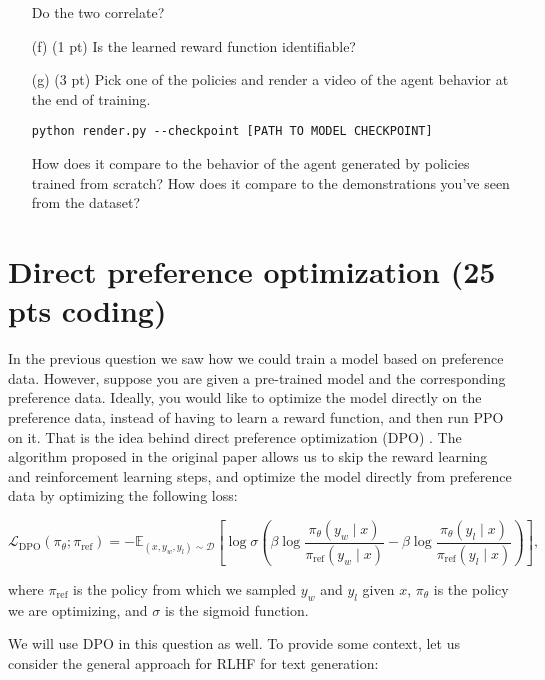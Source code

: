 \documentclass{article}
\begin{document}
\begin{enumerate}
Do the two correlate?

\item[(f) (1 pt)] Is the learned reward function identifiable?

\item[(g) (3 pt)] Pick one of the policies and render a video of the agent behavior at the end of training.

\begin{tcolorbox}
\begin{verbatim}
python render.py --checkpoint [PATH TO MODEL CHECKPOINT]
\end{verbatim}
\end{tcolorbox}

How does it compare to the behavior of the agent generated by policies trained from scratch? How does it compare to the demonstrations you've seen from the dataset?
\end{enumerate}

\section{Direct preference optimization (25 pts coding)}

In the previous question we saw how we could train a model based on preference data. However, suppose you are given a pre-trained model and the corresponding preference data. Ideally, you would like to optimize the model directly on the preference data, instead of having to learn a reward function, and then run PPO on it. That is the idea behind direct preference optimization (DPO) \cite{NEURIPS2023_a85b405e}. The algorithm proposed in the original paper allows us to skip the reward learning and reinforcement learning steps, and optimize the model directly from preference data by optimizing the following loss:

$$\mathcal{L}_{\mathrm{DPO}}\left(\pi_\theta ; \pi_{\mathrm{ref}}\right)=-\mathbb{E}_{\left(x, y_w, y_l\right) \sim \mathcal{D}}\left[\log \sigma\left(\beta \log \frac{\pi_\theta\left(y_w \mid x\right)}{\pi_{\mathrm{ref}}\left(y_w \mid x\right)}-\beta \log \frac{\pi_\theta\left(y_l \mid x\right)}{\pi_{\mathrm{ref}}\left(y_l \mid x\right)}\right)\right],$$

where $\pi_{\mathrm{ref}}$ is the policy from which we sampled $y_w$ and $y_l$ given $x$, $\pi_\theta$ is the policy we are optimizing, and $\sigma$ is the sigmoid function.

We will use DPO in this question as well.
To provide some context, let us consider the general approach for RLHF for text generation:
\end{document}
